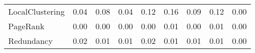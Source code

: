 \begin{table}[H]
{\begin{tabular}{|p{40mm}|ccc|ccccc|}
                  LocalClustering &                   {\small 0.04} &                  {\small 0.08} &                  {\small 0.04} &                     {\small 0.12} &                   {\small 0.16} &                     {\small 0.09} &                     {\small 0.12} &                     {\small 0.00} \\
                         PageRank &                   {\small 0.00} &                  {\small 0.00} &                  {\small 0.00} &                     {\small 0.00} &                   {\small 0.01} &                     {\small 0.00} &                     {\small 0.01} &                     {\small 0.00} \\
                       Redundancy &                   {\small 0.02} &                  {\small 0.01} &                  {\small 0.01} &                     {\small 0.02} &                   {\small 0.01} &                     {\small 0.01} &                     {\small 0.01} &                     {\small 0.00} \\
\bottomrule
\end{tabular}
}
\end{table}
